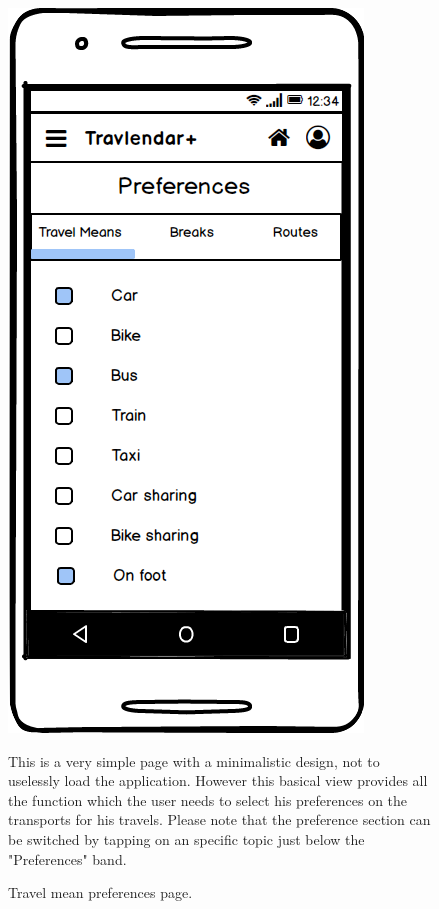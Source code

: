 \documentclass[11pt]{article}
\begin{document}
	\begin{figure}
		\centering
		\includegraphics[width=0.7\linewidth]{PreferencesTravelMeans.png}
		\caption{Travel mean preferences page.}
		\label{fig:preferencestravelmeans}
			\begin{center}
			This is a very simple page with a minimalistic design, not to uselessly load the application. However this basical view provides all the function which the user needs to select his preferences on the transports for his travels. 
			Please note that the preference section can be switched by tapping on an specific topic just below the "Preferences" band.
			\end{center}
	\end{figure}
\end{document}
